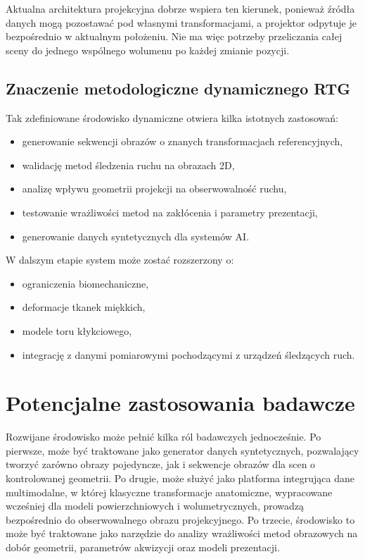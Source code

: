 \documentclass[11pt,a4paper]{article}
\begin{document}
Aktualna architektura projekcyjna dobrze wspiera ten kierunek, ponieważ źródła danych
mogą pozostawać pod własnymi transformacjami, a projektor odpytuje je bezpośrednio
w aktualnym położeniu. Nie ma więc potrzeby przeliczania całej sceny do jednego
wspólnego wolumenu po każdej zmianie pozycji.

\subsection{Znaczenie metodologiczne dynamicznego RTG}

Tak zdefiniowane środowisko dynamiczne otwiera kilka istotnych zastosowań:
\begin{itemize}
\item generowanie sekwencji obrazów o znanych transformacjach referencyjnych,
\item walidację metod śledzenia ruchu na obrazach 2D,
\item analizę wpływu geometrii projekcji na obserwowalność ruchu,
\item testowanie wrażliwości metod na zakłócenia i parametry prezentacji,
\item generowanie danych syntetycznych dla systemów AI.
\end{itemize}

W dalszym etapie system może zostać rozszerzony o:
\begin{itemize}
\item ograniczenia biomechaniczne,
\item deformacje tkanek miękkich,
\item modele toru kłykciowego,
\item integrację z danymi pomiarowymi pochodzącymi z urządzeń śledzących ruch.
\end{itemize}

\section{Potencjalne zastosowania badawcze}

Rozwijane środowisko może pełnić kilka ról badawczych jednocześnie. Po pierwsze,
może być traktowane jako generator danych syntetycznych, pozwalający tworzyć
zarówno obrazy pojedyncze, jak i sekwencje obrazów dla scen o kontrolowanej
geometrii. Po drugie, może służyć jako platforma integrująca dane multimodalne,
w której klasyczne transformacje anatomiczne, wypracowane wcześniej dla modeli
powierzchniowych i wolumetrycznych, prowadzą bezpośrednio do obserwowalnego obrazu
projekcyjnego. Po trzecie, środowisko to może być traktowane jako narzędzie
do analizy wrażliwości metod obrazowych na dobór geometrii, parametrów akwizycji
oraz modeli prezentacji.
\end{document}
